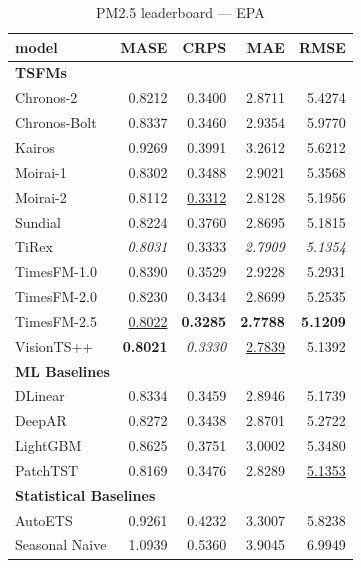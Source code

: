 \begin{table}[H]
\caption{PM2.5 leaderboard --- EPA}
\centering
\begin{small}
\begin{tabular}{lrrrr}
\toprule
model & MASE & CRPS & MAE & RMSE \\
\midrule
\multicolumn{5}{l}{\textbf{TSFMs}} \\
Chronos-2 & 0.8212 & 0.3400 & 2.8711 & 5.4274 \\
Chronos-Bolt & 0.8337 & 0.3460 & 2.9354 & 5.9770 \\
Kairos & 0.9269 & 0.3991 & 3.2612 & 5.6212 \\
Moirai-1 & 0.8302 & 0.3488 & 2.9021 & 5.3568 \\
Moirai-2 & 0.8112 & \underline{0.3312} & 2.8128 & 5.1956 \\
Sundial & 0.8224 & 0.3760 & 2.8695 & 5.1815 \\
TiRex & \textit{0.8031} & 0.3333 & \textit{2.7909} & \textit{5.1354} \\
TimesFM-1.0 & 0.8390 & 0.3529 & 2.9228 & 5.2931 \\
TimesFM-2.0 & 0.8230 & 0.3434 & 2.8699 & 5.2535 \\
TimesFM-2.5 & \underline{0.8022} & \textbf{0.3285} & \textbf{2.7788} & \textbf{5.1209} \\
VisionTS++ & \textbf{0.8021} & \textit{0.3330} & \underline{2.7839} & 5.1392 \\
\midrule
\multicolumn{5}{l}{\textbf{ML Baselines}} \\
DLinear & 0.8334 & 0.3459 & 2.8946 & 5.1739 \\
DeepAR & 0.8272 & 0.3438 & 2.8701 & 5.2722 \\
LightGBM & 0.8625 & 0.3751 & 3.0002 & 5.3480 \\
PatchTST & 0.8169 & 0.3476 & 2.8289 & \underline{5.1353} \\
\midrule
\multicolumn{5}{l}{\textbf{Statistical Baselines}} \\
AutoETS & 0.9261 & 0.4232 & 3.3007 & 5.8238 \\
Seasonal Naive & 1.0939 & 0.5360 & 3.9045 & 6.9949 \\
\bottomrule
\end{tabular}
\end{small}
\end{table}